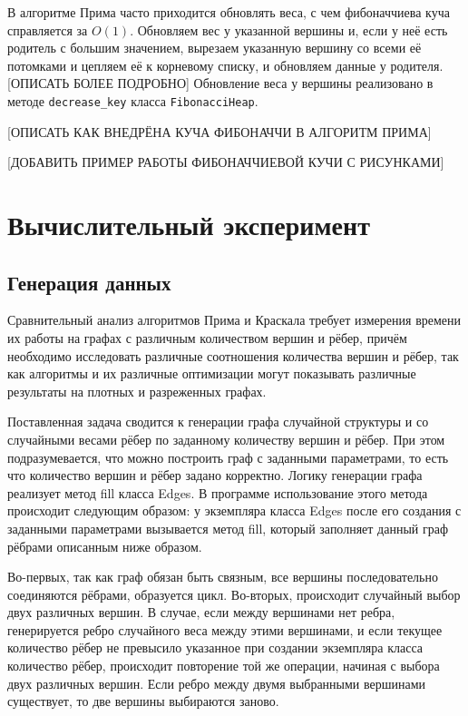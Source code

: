	В алгоритме Прима часто приходится обновлять веса, с чем фибоначчиева куча справляется за $O(1)$. Обновляем вес у указанной вершины и, если у неё есть родитель с большим значением, вырезаем указанную вершину со всеми её потомками и цепляем её к корневому списку, и обновляем данные у родителя. [ОПИСАТЬ БОЛЕЕ ПОДРОБНО] Обновление веса у вершины реализовано в методе \texttt{decrease\_key} класса \texttt{FibonacciHeap}.
	
	[ОПИСАТЬ КАК ВНЕДРЁНА КУЧА ФИБОНАЧЧИ В АЛГОРИТМ ПРИМА]
	
	[ДОБАВИТЬ ПРИМЕР РАБОТЫ ФИБОНАЧЧИЕВОЙ КУЧИ С РИСУНКАМИ]
	
	\newpage
	
	\section{Вычислительный эксперимент}
	
	\subsection{Генерация данных}
	
	\hspace{0.5 cm} 
	
	Сравнительный анализ алгоритмов Прима и Краскала требует измерения времени их работы на графах с различным количеством вершин и рёбер, причём необходимо исследовать различные соотношения количества вершин и рёбер, так как алгоритмы и их различные оптимизации могут показывать различные результаты на плотных и разреженных графах.
	
	Поставленная задача сводится к генерации графа случайной структуры и со случайными весами рёбер по заданному количеству вершин и рёбер. При этом подразумевается, что можно построить граф с заданными параметрами, то есть что количество вершин и рёбер задано корректно. Логику генерации графа реализует метод fill класса Edges. В программе использование этого метода происходит следующим образом: у экземпляра класса Edges после его создания с заданными параметрами вызывается метод fill, который заполняет данный граф рёбрами описанным ниже образом. 
	
	Во-первых, так как граф обязан быть связным, все вершины последовательно соединяются рёбрами, образуется цикл. Во-вторых, происходит случайный выбор двух различных вершин. В случае, если между вершинами нет ребра, генерируется ребро случайного веса между этими вершинами, и если текущее количество рёбер не превысило указанное при создании экземпляра класса количество рёбер, происходит повторение той же операции, начиная с выбора двух различных вершин. Если ребро между двумя выбранными вершинами существует, то две вершины выбираются заново. 
	
